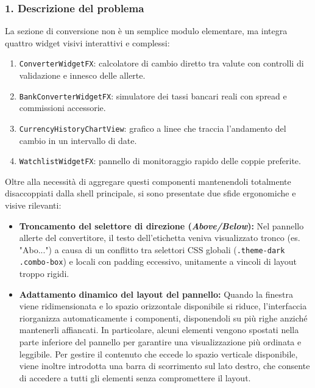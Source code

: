 \documentclass[11pt,a4paper,openright]{report}
\begin{document}
\subsubsection*{1. Descrizione del problema}
La sezione di conversione non è un semplice modulo elementare, ma integra quattro widget visivi interattivi e complessi:
\begin{enumerate}
  \item \texttt{ConverterWidgetFX}: calcolatore di cambio diretto tra valute con controlli di validazione e innesco delle allerte.
  \item \texttt{BankConverterWidgetFX}: simulatore dei tassi bancari reali con spread e commissioni accessorie.
  \item \texttt{CurrencyHistoryChartView}: grafico a linee che traccia l'andamento del cambio in un intervallo di date.
  \item \texttt{WatchlistWidgetFX}: pannello di monitoraggio rapido delle coppie preferite.
\end{enumerate}
Oltre alla necessità di aggregare questi componenti mantenendoli totalmente disaccoppiati dalla shell principale, si sono presentate due sfide ergonomiche e visive rilevanti:
\begin{itemize}
  \item \textbf{Troncamento del selettore di direzione (\emph{Above/Below}):} Nel pannello allerte del convertitore, il testo dell'etichetta veniva visualizzato tronco (es. "Abo...") a causa di un conflitto tra selettori CSS globali (\texttt{.theme-dark .combo-box}) e locali con padding eccessivo, unitamente a vincoli di layout troppo rigidi.
  \item \textbf{Adattamento dinamico del layout del pannello:} Quando la finestra viene ridimensionata e lo spazio orizzontale disponibile si riduce, l'interfaccia riorganizza automaticamente i componenti, disponendoli su più righe anziché mantenerli affiancati. In particolare, alcuni elementi vengono spostati nella parte inferiore del pannello per garantire una visualizzazione più ordinata e leggibile. Per gestire il contenuto che eccede lo spazio verticale disponibile, viene inoltre introdotta una barra di scorrimento sul lato destro, che consente di accedere a tutti gli elementi senza compromettere il layout.
\end{itemize}
\end{document}

